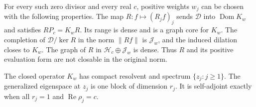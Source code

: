 \begin{theorem}
\label{mo:all-jets}
For every such zero divisor and every real $c$, positive weights
$w_j$ can be chosen with the following properties. The map
$R:f\mapsto(R_jf)_j$ sends $\mathscr D$ into
$\operatorname{Dom}K_w$ and satisfies $RP_c=K_wR$.
Its range is dense and is a graph core for $K_w$.
The completion of $\mathscr D/\ker R$ in the norm $\|Rf\|$
is $\mathscr J_w$, and the induced dilation closes to $K_w$.
The graph of $R$ in $\mathscr H_c\oplus\mathscr J_w$ is dense.
Thus $R$ and its positive evaluation form are not closable in
the original norm.

The closed operator $K_w$ has compact resolvent and spectrum
$\{z_j:j\geq1\}$. The generalized eigenspace at $z_j$ is one
block of dimension $r_j$. It is self-adjoint exactly when all
$r_j=1$ and $\operatorname{Re}\rho_j=c$.
\end{theorem}
